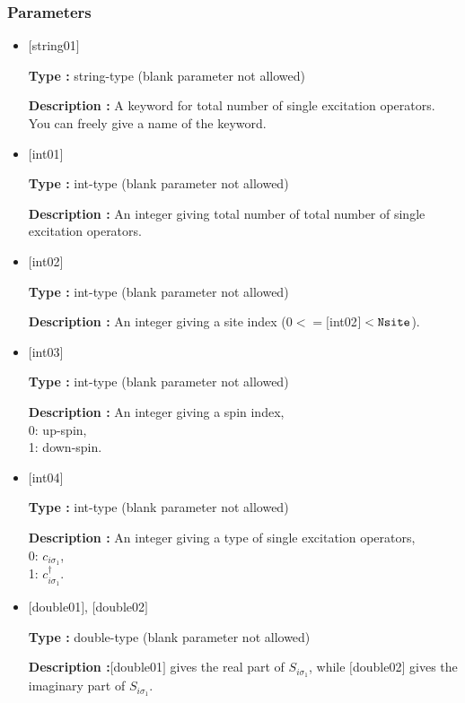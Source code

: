\subsubsection{Parameters}
 \begin{itemize}

   \item  $[$string01$]$
   
    {\bf Type :} string-type (blank parameter not allowed)

   {\bf Description :} A keyword for total number of single excitation operators. You can freely give a name of the keyword.

   \item  $[$int01$]$
   
    {\bf Type :} int-type (blank parameter not allowed)

   {\bf Description :} An integer giving total number of total number of single excitation operators.

  \item  $[$int02$]$

 {\bf Type :} int-type (blank parameter not allowed)

 {\bf Description :} An integer giving a site index ($0<= [$int02$]<\verb|Nsite|$).
 
  \item  $[$int03$]$
  
 {\bf Type :} int-type (blank parameter not allowed)

{\bf Description :} 
An integer giving a spin index,\\
0: up-spin,\\
1: down-spin.

\item  $[$int04$]$

 {\bf Type :} int-type (blank parameter not allowed)

{\bf Description :} 
An integer giving a type of single excitation operators,\\
0: $ c_{i\sigma_1}$,\\
1: $ c_{i\sigma_1}^{\dagger}$.\\

\item  $[$double01$]$, $[$double02$]$

 {\bf Type :} double-type (blank parameter not allowed)

{\bf Description :}$[$double01$]$ gives the real part of $S_{i\sigma_1}$, while $[$double02$]$ gives the imaginary part of $S_{i\sigma_1}$.

\end{itemize}

